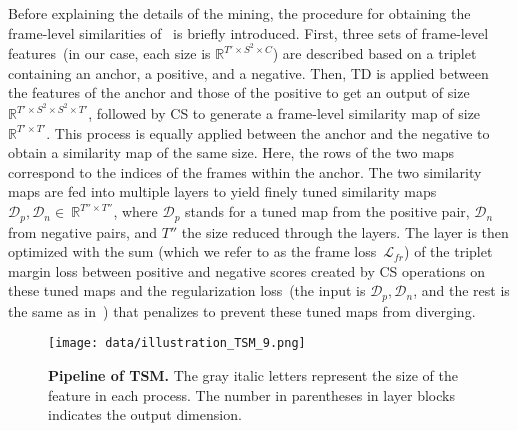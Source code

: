 \documentclass[10pt,twocolumn,letterpaper]{article}
\begin{document}
            Before explaining the details of the mining, the procedure for obtaining the frame-level similarities of~\cite{kordopatis2019visil} is briefly introduced. First, three sets of frame-level features~(in our case, each size is $\mathbb{R}^{T' \times S^2 \times C}$) are described based on a triplet containing an anchor, a positive, and a negative. Then, TD is applied between the features of the anchor and those of the positive to get an output of size~$\mathbb{R}^{T' \times S^2 \times S^2 \times T'}$, followed by CS to generate a frame-level similarity map of size $\mathbb{R}^{T' \times T'}$. This process is equally applied between the anchor and the negative to obtain a similarity map of the same size. Here, the rows of the two maps correspond to the indices of the frames within the anchor. The two similarity maps are fed into multiple layers to yield finely tuned similarity maps~$\mathcal{D}_{p},\mathcal{D}_{n}\in~\mathbb{R}^{T'' \times T''}$, where $\mathcal{D}_{p}$ stands for a tuned map from the positive pair, $\mathcal{D}_{n}$ from negative pairs, and $T''$ the size reduced through the layers. The layer is then optimized with the sum (which we refer to as the frame loss~$\mathcal{L}_{fr}$) of the triplet margin loss between positive and negative scores created by CS operations on these tuned maps and the regularization loss~(the input is $\mathcal{D}_{p}, \mathcal{D}_{n}$, and the rest is the same as in~\cite{kordopatis2019visil}) that penalizes to prevent these tuned maps from diverging.

        \begin{figure}[t!]
            \centering
            \texttt{[image: data/illustration\_TSM\_9.png]} 
            \vspace{-3mm}
            \caption{\textbf{Pipeline of TSM.} The gray italic letters represent the size of the feature in each process. The number in parentheses in layer blocks indicates the output dimension. \vspace{-4mm}} \label{fig:tsm}
        \end{figure}
        
\end{document}
